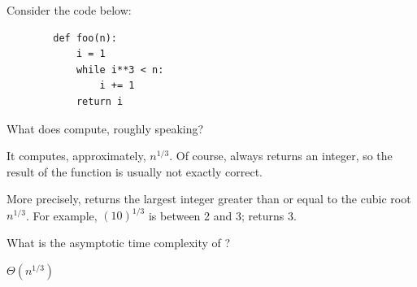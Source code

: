 \begin{prob}
    Consider the code below:

    \begin{verbatim}
        def foo(n):
            i = 1
            while i**3 < n:
                i += 1
            return i
    \end{verbatim}

    \begin{subprobset}
        \begin{subprob}
            What does  compute, roughly speaking?

            \begin{soln}
                It computes, approximately, $n^{1/3}$. Of course, 
                always returns an integer, so the result of the function is usually
                not exactly correct.

                More precisely,  returns the largest integer greater
                than or equal to the cubic root $n^{1/3}$. For example, $(10)^{1/3}$ is between 2 and 3;
                 returns 3.
            \end{soln}
        \end{subprob}

        \begin{subprob}
            What is the asymptotic time complexity of ?

            \begin{soln}
               $\Theta(n^{1/3})$

            \end{soln}
        \end{subprob}
    \end{subprobset}

\end{prob}
